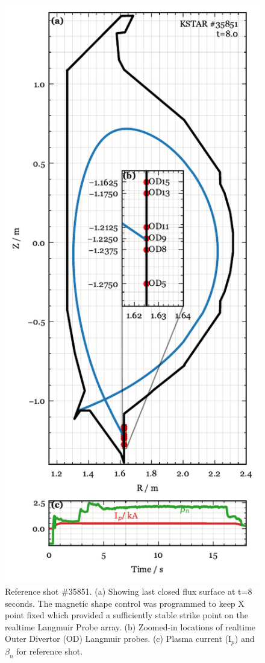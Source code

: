\begin{figure}[!ht]
 \centering
 \includegraphics[width=\linewidth]{figures/RefShot.pdf}
 \caption{
Reference shot \#35851.
(a) Showing last closed flux surface at t=8 seconds.
The magnetic shape control was programmed to keep X point fixed which provided a sufficiently stable strike point on the realtime Langmuir Probe array.
(b) Zoomed-in locations of realtime Outer Divertor (OD) Langmuir probes.
(c) Plasma current (I$_p$) and $\beta_n$ for reference shot.
}
 \label{fig:ref_shot}
\end{figure}